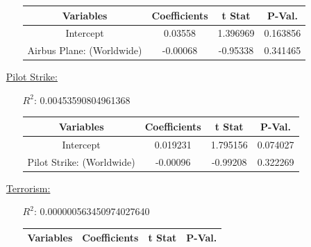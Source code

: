 \documentclass[12pt]{report}
\begin{document}
\begin{enumerate}
\begin{enumerate}
            \begin{tabular}{|c|c|c|c|}
                    \toprule  \hline
                    \textbf{Variables} & \textbf{Coefficients} &  \textbf{t Stat}&\textbf{P-Val.} \\  \hline

                    Intercept & 0.03558 &  1.396969 &0.163856\\  \hline
                    Airbus Plane: (Worldwide) & -0.00068 & -0.95338 &0.341465 \\  \hline
                    \bottomrule
                \end{tabular}

        \end{enumerate}
    \item[\underline{Pilot Strike:}]
        \begin{enumerate}
            \item[$R^2$:]0.00453590804961368
            \item[]

                \begin{tabular}{|c|c|c|c|}
                    \toprule  \hline
                    \textbf{Variables} & \textbf{Coefficients}   & \textbf{t Stat}&\textbf{P-Val.} \\  \hline

                    Intercept & 0.019231  & 1.795156 &0.074027 \\  \hline
                    Pilot Strike: (Worldwide) & -0.00096  & -0.99208 &0.322269 \\  \hline
                    \bottomrule
                \end{tabular}





        \end{enumerate}
    \item[\underline{Terrorism:}]\\
        \begin{enumerate}
            \item[$R^2$:]0.000000563450974027640
            \item[]


                \begin{tabular}{|c|c|c|c|}
                    \toprule  \hline
                    \textbf{Variables} & \textbf{Coefficients} & \textbf{t Stat}&\textbf{P-Val.} \\  \hline


\end{tabular}
\end{enumerate}
\end{enumerate}
\end{document}
